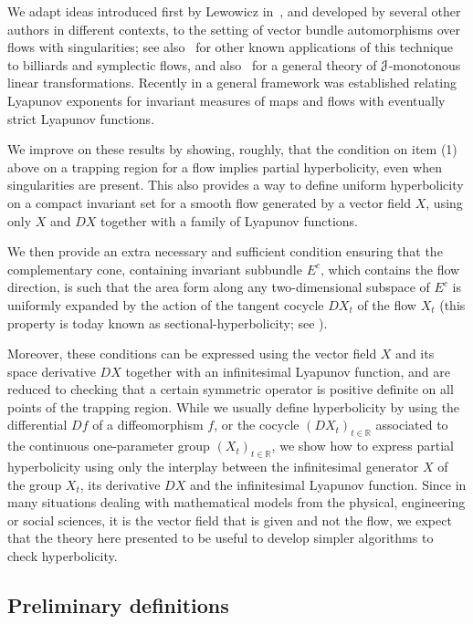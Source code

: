 \documentclass[12pt,reqno]{amsart}
\numberwithin{equation}{section}
\theoremstyle{plain}
\theoremstyle{definition}
\newcommand{\RR}{{\mathbb R}}
\newcommand{\J}{\EuScript{J}}
\begin{document}
We adapt ideas introduced first by Lewowicz
in~\cite{lewow80}, and developed by several other authors in
different contexts, to the setting of vector bundle
automorphisms over flows with singularities; see
also~\cite{Wojtk01,Wojtk00,Mrkr88} for other known
applications of this technique to billiards and symplectic
flows, and also~\cite{Pota79,Pota60} for a general theory of
$\J$-monotonous linear transformations. Recently in
\cite{BaDrVal12} a general framework was established
relating Lyapunov exponents for invariant measures of
maps and flows with eventually strict Lyapunov functions.

We improve on these results by showing, roughly, that the
condition on item (1) above on a trapping region for a flow
implies partial hyperbolicity, even when singularities are
present. This also provides a way to define uniform
hyperbolicity on a compact invariant set for a smooth flow
generated by a vector field $X$, using only $X$ and $DX$
together with a family of Lyapunov functions.

We then provide an extra necessary and sufficient condition
ensuring that the complementary cone, containing invariant
subbundle $E^c$, which contains the flow direction, is such
that the area form along any two-dimensional subspace of
$E^c$ is uniformly expanded by the action of the tangent
cocycle $DX_t$ of the flow $X_t$ (this property is today
known as sectional-hyperbolicity; see \cite{MeMor06}).

Moreover, these conditions can be expressed using the vector
field $X$ and its space derivative $DX$ together with an
infinitesimal Lyapunov function, and are reduced to checking
that a certain symmetric operator is positive definite on
all points of the trapping region. While we usually define
hyperbolicity by using the differential $Df$ of a
diffeomorphism $f$, or the cocycle $(DX_t)_{t\in\RR}$
associated to the continuous one-parameter group
$(X_t)_{t\in\RR}$, we show how to express partial
hyperbolicity using only the interplay between the
infinitesimal generator $X$ of the group $X_t$, its
derivative $DX$ and the infinitesimal Lyapunov function.
Since in many situations dealing with mathematical models
from the physical, engineering or social sciences, it is the
vector field that is given and not the flow, we expect that
the theory here presented to be useful to develop simpler
algorithms to check hyperbolicity.




\subsection{Preliminary definitions}
\label{sec:prelim-definit}
\end{document}
